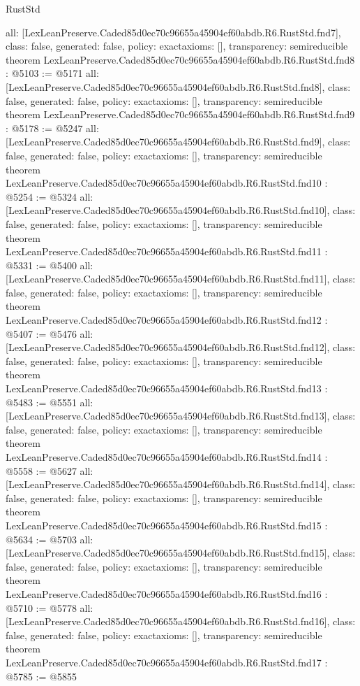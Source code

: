 \begin{lexlean}{RustStd}
\begin{coremodule}
{  all: [LexLeanPreserve.Caded85d0ec70c96655a45904ef60abdb.R6.RustStd.fnd7],
  class: false,
  generated: false,
  policy: exact{axioms: []},
  transparency: semireducible
}
theorem LexLeanPreserve.Caded85d0ec70c96655a45904ef60abdb.R6.RustStd.fnd8 : @5103 := @5171 {
  all: [LexLeanPreserve.Caded85d0ec70c96655a45904ef60abdb.R6.RustStd.fnd8],
  class: false,
  generated: false,
  policy: exact{axioms: []},
  transparency: semireducible
}
theorem LexLeanPreserve.Caded85d0ec70c96655a45904ef60abdb.R6.RustStd.fnd9 : @5178 := @5247 {
  all: [LexLeanPreserve.Caded85d0ec70c96655a45904ef60abdb.R6.RustStd.fnd9],
  class: false,
  generated: false,
  policy: exact{axioms: []},
  transparency: semireducible
}
theorem LexLeanPreserve.Caded85d0ec70c96655a45904ef60abdb.R6.RustStd.fnd10 : @5254 := @5324 {
  all: [LexLeanPreserve.Caded85d0ec70c96655a45904ef60abdb.R6.RustStd.fnd10],
  class: false,
  generated: false,
  policy: exact{axioms: []},
  transparency: semireducible
}
theorem LexLeanPreserve.Caded85d0ec70c96655a45904ef60abdb.R6.RustStd.fnd11 : @5331 := @5400 {
  all: [LexLeanPreserve.Caded85d0ec70c96655a45904ef60abdb.R6.RustStd.fnd11],
  class: false,
  generated: false,
  policy: exact{axioms: []},
  transparency: semireducible
}
theorem LexLeanPreserve.Caded85d0ec70c96655a45904ef60abdb.R6.RustStd.fnd12 : @5407 := @5476 {
  all: [LexLeanPreserve.Caded85d0ec70c96655a45904ef60abdb.R6.RustStd.fnd12],
  class: false,
  generated: false,
  policy: exact{axioms: []},
  transparency: semireducible
}
theorem LexLeanPreserve.Caded85d0ec70c96655a45904ef60abdb.R6.RustStd.fnd13 : @5483 := @5551 {
  all: [LexLeanPreserve.Caded85d0ec70c96655a45904ef60abdb.R6.RustStd.fnd13],
  class: false,
  generated: false,
  policy: exact{axioms: []},
  transparency: semireducible
}
theorem LexLeanPreserve.Caded85d0ec70c96655a45904ef60abdb.R6.RustStd.fnd14 : @5558 := @5627 {
  all: [LexLeanPreserve.Caded85d0ec70c96655a45904ef60abdb.R6.RustStd.fnd14],
  class: false,
  generated: false,
  policy: exact{axioms: []},
  transparency: semireducible
}
theorem LexLeanPreserve.Caded85d0ec70c96655a45904ef60abdb.R6.RustStd.fnd15 : @5634 := @5703 {
  all: [LexLeanPreserve.Caded85d0ec70c96655a45904ef60abdb.R6.RustStd.fnd15],
  class: false,
  generated: false,
  policy: exact{axioms: []},
  transparency: semireducible
}
theorem LexLeanPreserve.Caded85d0ec70c96655a45904ef60abdb.R6.RustStd.fnd16 : @5710 := @5778 {
  all: [LexLeanPreserve.Caded85d0ec70c96655a45904ef60abdb.R6.RustStd.fnd16],
  class: false,
  generated: false,
  policy: exact{axioms: []},
  transparency: semireducible
}
theorem LexLeanPreserve.Caded85d0ec70c96655a45904ef60abdb.R6.RustStd.fnd17 : @5785 := @5855 {
}
\end{coremodule}
\end{lexlean}

